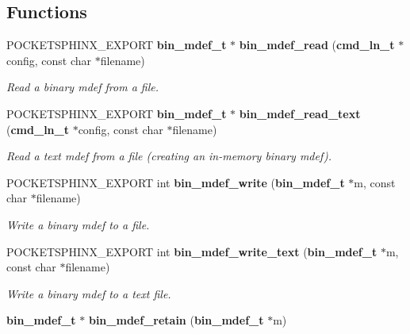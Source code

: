 \subsection*{Functions}
\begin{DoxyCompactItemize}
\item 
P\-O\-C\-K\-E\-T\-S\-P\-H\-I\-N\-X\-\_\-\-E\-X\-P\-O\-R\-T {\bf bin\-\_\-mdef\-\_\-t} $\ast$ {\bf bin\-\_\-mdef\-\_\-read} ({\bf cmd\-\_\-ln\-\_\-t} $\ast$config, const char $\ast$filename)\label{bin__mdef_8h_a3930ae6b3309a615335585db4b46306f}

\begin{DoxyCompactList}\small\item\em Read a binary mdef from a file. \end{DoxyCompactList}\item 
P\-O\-C\-K\-E\-T\-S\-P\-H\-I\-N\-X\-\_\-\-E\-X\-P\-O\-R\-T {\bf bin\-\_\-mdef\-\_\-t} $\ast$ {\bf bin\-\_\-mdef\-\_\-read\-\_\-text} ({\bf cmd\-\_\-ln\-\_\-t} $\ast$config, const char $\ast$filename)\label{bin__mdef_8h_a00dab94d45d1adc5f7778fd1e2398031}

\begin{DoxyCompactList}\small\item\em Read a text mdef from a file (creating an in-\/memory binary mdef). \end{DoxyCompactList}\item 
P\-O\-C\-K\-E\-T\-S\-P\-H\-I\-N\-X\-\_\-\-E\-X\-P\-O\-R\-T int {\bf bin\-\_\-mdef\-\_\-write} ({\bf bin\-\_\-mdef\-\_\-t} $\ast$m, const char $\ast$filename)\label{bin__mdef_8h_a982b8e598afed47805fab1509e8fc4bb}

\begin{DoxyCompactList}\small\item\em Write a binary mdef to a file. \end{DoxyCompactList}\item 
P\-O\-C\-K\-E\-T\-S\-P\-H\-I\-N\-X\-\_\-\-E\-X\-P\-O\-R\-T int {\bf bin\-\_\-mdef\-\_\-write\-\_\-text} ({\bf bin\-\_\-mdef\-\_\-t} $\ast$m, const char $\ast$filename)\label{bin__mdef_8h_af89d79226df33947019efcfe7377d586}

\begin{DoxyCompactList}\small\item\em Write a binary mdef to a text file. \end{DoxyCompactList}\item 
{\bf bin\-\_\-mdef\-\_\-t} $\ast$ {\bf bin\-\_\-mdef\-\_\-retain} ({\bf bin\-\_\-mdef\-\_\-t} $\ast$m)\label{bin__mdef_8h_a297167f03662a9cbd650743d3f4cf8f8}


\end{DoxyCompactItemize}
